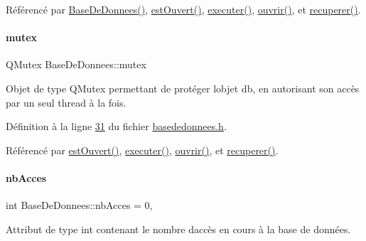 Référencé par \hyperlink{basededonnees_8cpp_source_l00015}{Base\+De\+Donnees()}, \hyperlink{basededonnees_8cpp_source_l00098}{est\+Ouvert()}, \hyperlink{basededonnees_8cpp_source_l00104}{executer()}, \hyperlink{basededonnees_8cpp_source_l00063}{ouvrir()}, et \hyperlink{basededonnees_8cpp_source_l00139}{recuperer()}.

\mbox{\label{class_base_de_donnees_aa1b4696fac87a740f914aa73739086f2}} 
\paragraph{\texorpdfstring{mutex}{mutex}}
{\footnotesize\ttfamily Q\+Mutex Base\+De\+Donnees\+::mutex\hspace{0.3cm}{\ttfamily [private]}}



Objet de type Q\+Mutex permettant de protéger l\textquotesingle{}objet db, en autorisant son accès par un seul thread à la fois. 



Définition à la ligne \hyperlink{basededonnees_8h_source_l00031}{31} du fichier \hyperlink{basededonnees_8h_source}{basededonnees.\+h}.



Référencé par \hyperlink{basededonnees_8cpp_source_l00098}{est\+Ouvert()}, \hyperlink{basededonnees_8cpp_source_l00104}{executer()}, \hyperlink{basededonnees_8cpp_source_l00063}{ouvrir()}, et \hyperlink{basededonnees_8cpp_source_l00139}{recuperer()}.

\mbox{\label{class_base_de_donnees_a5099ecb2922bb31d84cd5d4505298a29}} 
\paragraph{\texorpdfstring{nb\+Acces}{nbAcces}}
{\footnotesize\ttfamily int Base\+De\+Donnees\+::nb\+Acces = 0\hspace{0.3cm}{\ttfamily [static]}, {\ttfamily [private]}}



Attribut de type int contenant le nombre d\textquotesingle{}accès en cours à la base de données. 



